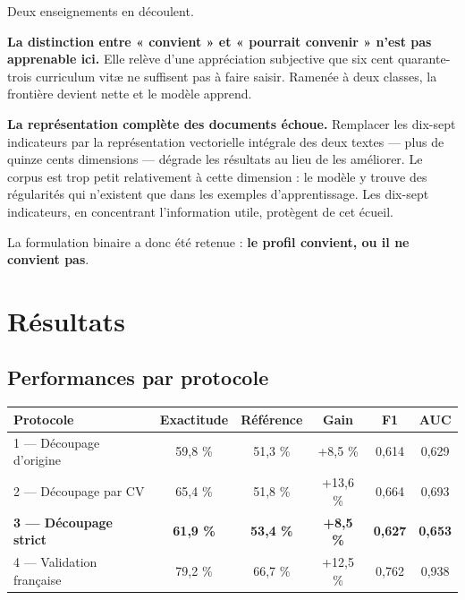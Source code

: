 \documentclass[11pt,a4paper]{article}
\begin{document}
\vspace{2mm}
\noindent Deux enseignements en découlent.

\textbf{La distinction entre « convient » et « pourrait convenir » n'est pas apprenable ici.} Elle relève d'une appréciation subjective que six cent quarante-trois curriculum vitæ ne suffisent pas à faire saisir. Ramenée à deux classes, la frontière devient nette et le modèle apprend.

\textbf{La représentation complète des documents échoue.} Remplacer les dix-sept indicateurs par la représentation vectorielle intégrale des deux textes — plus de quinze cents dimensions — dégrade les résultats au lieu de les améliorer. Le corpus est trop petit relativement à cette dimension : le modèle y trouve des régularités qui n'existent que dans les exemples d'apprentissage. Les dix-sept indicateurs, en concentrant l'information utile, protègent de cet écueil.

La formulation binaire a donc été retenue : \textbf{le profil convient, ou il ne convient pas}.

\section{Résultats}

\subsection{Performances par protocole}

\begin{center}
\small
\begin{tabular}{lccccc}
  \toprule
  \textbf{Protocole} & \textbf{Exactitude} & \textbf{Référence} & \textbf{Gain} & \textbf{F1} & \textbf{AUC} \\
  \midrule
  1 --- Découpage d'origine & 59,8 \% & 51,3 \% & +8,5 \% & 0,614 & 0,629 \\
  2 --- Découpage par CV & 65,4 \% & 51,8 \% & +13,6 \% & 0,664 & 0,693 \\
  \textbf{3 --- Découpage strict} & \textbf{61,9 \%} & \textbf{53,4 \%} & \textcolor{vert}{\textbf{+8,5 \%}} & \textbf{0,627} & \textbf{0,653} \\
  4 --- Validation française & 79,2 \% & 66,7 \% & +12,5 \% & 0,762 & 0,938 \\
  \bottomrule
\end{tabular}
\end{center}
\end{document}

